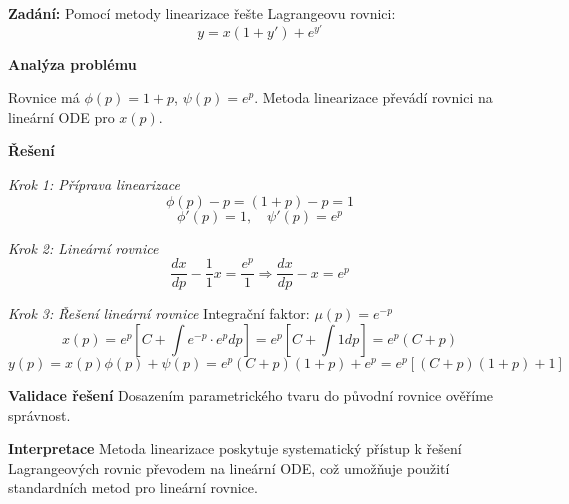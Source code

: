     \begin{example}
    \label{ex:linearizace-lagrange}
    
    \noindent\textbf{Zadání:} Pomocí metody linearizace řešte Lagrangeovu rovnici:
    \[
    y = x(1 + y') + e^{y'}
    \]
    
    \vspace{1.5\baselineskip}
    
    \noindent\textbf{Analýza problému}
    
    Rovnice má $\phi(p) = 1 + p$, $\psi(p) = e^p$. Metoda linearizace převádí rovnici na lineární ODE pro $x(p)$.
    
    \vspace{1.5\baselineskip}
    
    \noindent\textbf{Řešení}
    
    \noindent\textit{Krok 1: Příprava linearizace}
    \[
    \phi(p) - p = (1 + p) - p = 1
    \]
    \[
    \phi'(p) = 1, \quad \psi'(p) = e^p
    \]
    
    \vspace{1\baselineskip}
    
    \noindent\textit{Krok 2: Lineární rovnice}
    \[
    \frac{dx}{dp} - \frac{1}{1}x = \frac{e^p}{1} \Rightarrow \frac{dx}{dp} - x = e^p
    \]
    
    \vspace{1\baselineskip}
    
    \noindent\textit{Krok 3: Řešení lineární rovnice}
    Integrační faktor: $\mu(p) = e^{-p}$
    \[
    x(p) = e^{p} \left[ C + \int e^{-p} \cdot e^p dp \right] = e^{p} \left[ C + \int 1 dp \right] = e^{p}(C + p)
    \]
    \[
    y(p) = x(p)\phi(p) + \psi(p) = e^{p}(C + p)(1 + p) + e^p = e^{p}[(C + p)(1 + p) + 1]
    \]
    
    \vspace{1.5\baselineskip}
    
    \noindent\textbf{Validace řešení}
    Dosazením parametrického tvaru do původní rovnice ověříme správnost.
    
    \vspace{1.5\baselineskip}
    
    \noindent\textbf{Interpretace}
    Metoda linearizace poskytuje systematický přístup k řešení Lagrangeových rovnic převodem na lineární ODE, což umožňuje použití standardních metod pro lineární rovnice.
    
    \end{example}

